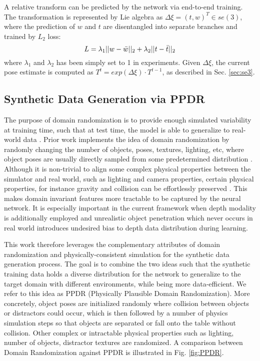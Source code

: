 \documentclass[letterpaper, 10 pt, conference]{ieeeconf}
\begin{document}
A relative transform can be predicted by the network via end-to-end training. The transformation is represented by Lie algebra as $\Delta \xi = (t,w)^T  \in se(3)$, where the prediction of $w$ and $t$ are disentangled into separate branches and trained by $L_2$ loss: 
\vspace{-0.15in}
$$
L=\lambda_1||w-\bar{w}||_2 + \lambda_2||t-\bar{t}||_2
\vspace{-0.04in}$$
\noindent where $\lambda_1$ and $\lambda_2$ has been simply set to 1 in experiments. Given $\Delta \xi$, the current pose estimate is computed as  $T^{t}=exp(\Delta \xi) \cdot T^{t-1}$, as described in Sec. \ref{sec:se3}. 

\label{sec:syn_data_gen}
\subsection{Synthetic Data Generation via PPDR}

The purpose of domain randomization is to provide enough simulated variability at training time, such that at test time, the model is able to generalize to real-world data \cite{tobin2017domain}. Prior work implements the idea of domain randomization by randomly changing the number of objects, poses, textures, lighting, etc, where object poses are usually directly sampled from some predetermined distribution \cite{tobin2017domain,xiang2017posecnn,tremblay2018deep}. Although it is non-trivial to align some complex physical properties between the simulator and real world, such as lighting and camera properties, certain physical properties, for instance gravity and collision can be effortlessly preserved \cite{tremblay2018falling,mitash2017self}. This makes domain invariant features more tractable to be captured by the neural network. It is especially important in the current framework when depth modality is additionally employed and unrealistic object penetration which never occurs in real world introduces undesired bias to depth data distribution during learning.

This work therefore leverages the complementary attributes of domain randomization and physically-consistent simulation for the synthetic data generation process. The goal is to combine the two ideas such that the synthetic training data holds a diverse distribution for the network to generalize to the target domain with different environments, while being more data-efficient. We refer to this idea as PPDR (Physically Plausible Domain Randomization). More concretely, object poses are initialized randomly where collision between objects or distractors could occur, which is then followed by a number of physics simulation steps so that objects are separated or fall onto the table without collision. Other complex or intractable physical properties such as lighting, number of objects, distractor textures are randomized. A comparison between Domain Randomization against PPDR is illustrated in Fig. \ref{fig:PPDR}. 
\end{document}
